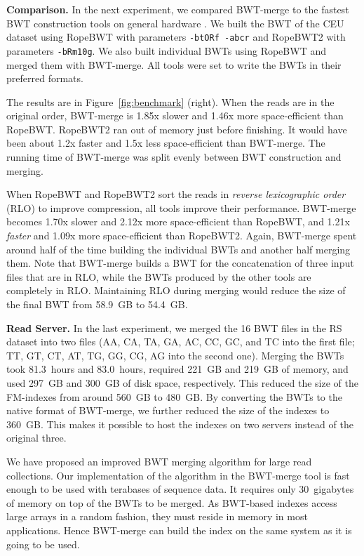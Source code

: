 \documentclass[smallabstract,smallcaptions]{dccpaper}
\newcommand{\BWT}{\textsf{BWT}}
\newcommand{\BWTmerge}{\textsf{BWT\nobreakdash-merge}}
\newcommand{\ropebwt}{\textsf{RopeBWT}}
\newcommand{\ropebwtii}{\textsf{RopeBWT2}}
\newcommand{\CEU}{\textsf{CEU}}
\newcommand{\RS}{\textsf{RS}}
\begin{document}
\smallbreak\noindent\textbf{Comparison.} In the next experiment, we compared \BWTmerge{} to the fastest \BWT{} construction tools on general hardware \cite{Li2014a}. We built the \BWT{} of the \CEU{} dataset using \ropebwt{} \cite{Li2011-2013} with parameters \texttt{-btORf -abcr} and \ropebwtii{} \cite{Li2014a} with parameters \texttt{-bRm10g}. We also built individual \BWT{}s using \ropebwt{} and merged them with \BWTmerge. All tools were set to write the \BWT{}s in their preferred formats.

The results are in Figure~\ref{fig:benchmark} (right). When the reads are in the original order, \BWTmerge{} is 1.85x slower and 1.46x more space-efficient than \ropebwt. \ropebwt2{} ran out of memory just before finishing. It would have been about 1.2x faster and 1.5x less space-efficient than \BWTmerge. The running time of \BWTmerge{} was split evenly between \BWT{} construction and merging.

When \ropebwt{} and \ropebwt2{} sort the reads in \emph{reverse lexicographic order} (RLO) to improve compression, all tools improve their performance. \BWTmerge{} becomes 1.70x slower and 2.12x more space-efficient than \ropebwt{}, and 1.21x \emph{faster} and 1.09x more space-efficient than \ropebwt2.
Again, \BWTmerge{} spent around half of the time building the individual \BWT{}s and another half merging them. Note that \BWTmerge{} builds a \BWT{} for the concatenation of three input files that are in RLO, while the \BWT{}s produced by the other tools are completely in RLO. Maintaining RLO during merging would reduce the size of the final \BWT{} from 58.9~GB to 54.4~GB.

\smallbreak\noindent\textbf{Read Server.} In the last experiment, we merged the 16 \BWT{} files in the \RS{} dataset into two files (AA, CA, TA, GA, AC, CC, GC, and TC into the first file; TT, GT, CT, AT, TG, GG, CG, AG into the second one). Merging the \BWT{}s took 81.3~hours and 83.0~hours, required 221~GB and 219~GB of memory, and used 297~GB and 300~GB of disk space, respectively. This reduced the size of the FM-indexes from around 560~GB to 480~GB. By converting the \BWT{}s to the native format of \BWTmerge{}, we further reduced the size of the indexes to 360~GB.
This makes it possible to host the indexes on two servers instead of the original three.



We have proposed an improved \BWT{} merging algorithm for large read collections. Our implementation of the algorithm in the \BWTmerge{} tool is fast enough to be used with terabases of sequence data. It requires only 30~gigabytes of memory on top of the \BWT{}s to be merged. As \BWT-based indexes access large arrays in a random fashion, they must reside in memory in most applications. Hence \BWTmerge{} can build the index on the same system as it is going to be used.
\end{document}
